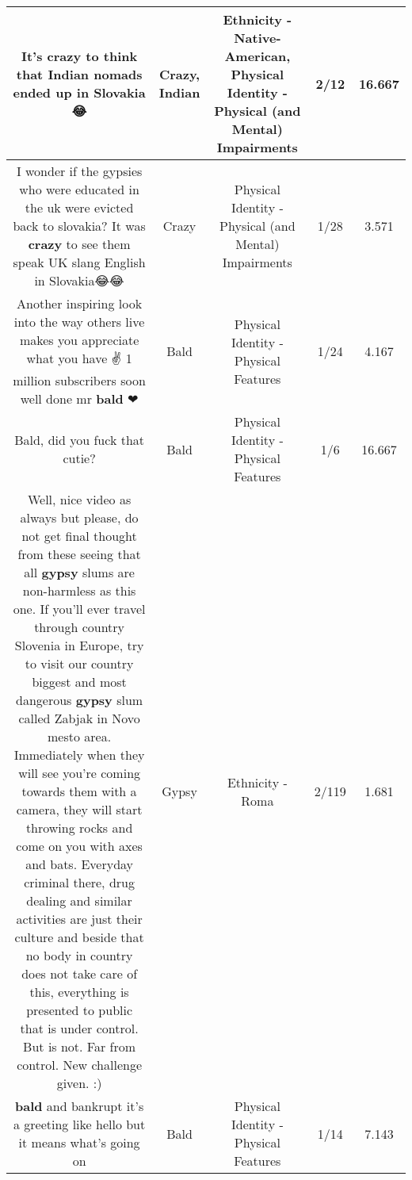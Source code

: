 \documentclass[11pt]{article}
\newlength\mylength
\begin{document}
\begin{center}
\begin{longtable}{|C{.65\mylength}|C{.30\mylength}|C{.12\mylength}|C{.12\mylength}|C{.12\mylength}|}
  \small It's \textbf{crazy} to think that \textbf{Indian} nomads ended up in Slovakia 😂\normalsize   & Crazy, Indian & Ethnicity - Native-American, Physical Identity - Physical (and Mental) Impairments & 2/12 & 16.667 \\  \hline
  \small I wonder if the gypsies who were educated in the uk were evicted back to slovakia? It was \textbf{crazy} to see them speak UK slang English in Slovakia😂😂\normalsize   & Crazy & Physical Identity - Physical (and Mental) Impairments & 1/28 & 3.571 \\  \hline
  \small Another inspiring look into the way others live makes you appreciate what you have ✌ 1 million subscribers soon well done mr \textbf{bald} ❤\normalsize   & Bald & Physical Identity - Physical Features & 1/24 & 4.167 \\  \hline
  \small Bald, did you fuck that cutie?\normalsize   & Bald & Physical Identity - Physical Features & 1/6 & 16.667 \\  \hline
  \small Well, nice video as always but please, do not get final thought from these seeing that all \textbf{gypsy} slums are non-harmless as this one. If you'll ever travel through country Slovenia in Europe, try to visit our country biggest and most dangerous \textbf{gypsy} slum called Zabjak in Novo mesto area. Immediately when they will see you're coming towards them with a camera, they will start throwing rocks and come on you with axes and bats. Everyday criminal there, drug dealing and similar activities are just their culture and beside that no body in country does not take care of this, everything is presented to public that is under control. But is not. Far from control. New challenge given. :)\normalsize   & Gypsy & Ethnicity - Roma & 2/119 & 1.681 \\  \hline
  \small \@\textbf{bald} and bankrupt it's a greeting like hello but it means what's going on\normalsize   & Bald & Physical Identity - Physical Features & 1/14 & 7.143 \\  \hline

\end{longtable}
\end{center}
\end{document}
